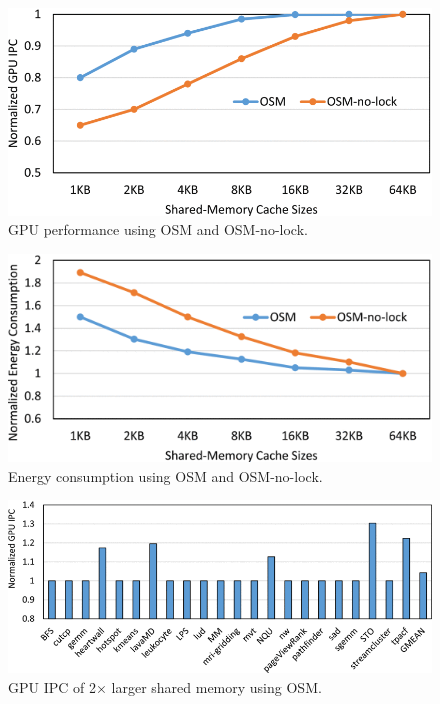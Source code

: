\documentclass[
    fontset=fandol,
    xcolor=svgnames %
]{ctexbeamer}
\begin{document}
\begin{frame}

    \begin{figure}
        \includegraphics[width=1\textwidth]{assets/figure/sadro10-3154315-large.png}
        \caption{GPU performance using OSM and OSM-no-lock.}
    \end{figure}

\end{frame}

\begin{frame}

    \begin{figure}
        \includegraphics[width=1\textwidth]{assets/figure/sadro11-3154315-large.png}
        \caption{Energy consumption using OSM and OSM-no-lock.}
    \end{figure}

\end{frame}

\begin{frame}

    \begin{figure}
        \includegraphics[width=1\textwidth]{assets/figure/sadro12-3154315-large.png}
        \caption{GPU IPC of 2× larger shared memory using OSM.}
    \end{figure}

\end{frame}
\end{document}
